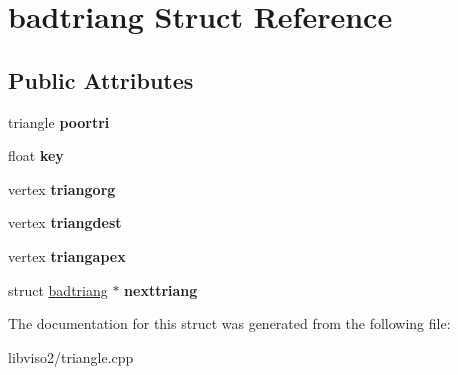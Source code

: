 \hypertarget{structbadtriang}{\section{badtriang Struct Reference}
\label{structbadtriang}
}
\subsection*{Public Attributes}
\begin{DoxyCompactItemize}
\item 
\hypertarget{structbadtriang_a11b132e0890478d17dff89632f334430}{triangle {\bfseries poortri}}\label{structbadtriang_a11b132e0890478d17dff89632f334430}

\item 
\hypertarget{structbadtriang_a9b7ace12adc62cf68e36e08bd8fbe9cb}{float {\bfseries key}}\label{structbadtriang_a9b7ace12adc62cf68e36e08bd8fbe9cb}

\item 
\hypertarget{structbadtriang_a92cb1bf38baf5779865262bacc7f8139}{vertex {\bfseries triangorg}}\label{structbadtriang_a92cb1bf38baf5779865262bacc7f8139}

\item 
\hypertarget{structbadtriang_ab1ad44ac98c5e8fd7940ad45f6ef25d1}{vertex {\bfseries triangdest}}\label{structbadtriang_ab1ad44ac98c5e8fd7940ad45f6ef25d1}

\item 
\hypertarget{structbadtriang_a44ad69b4811716b4adf50f50b98ab7f0}{vertex {\bfseries triangapex}}\label{structbadtriang_a44ad69b4811716b4adf50f50b98ab7f0}

\item 
\hypertarget{structbadtriang_abe7ce1ffe7da4fe5cb17ebcbaa18515b}{struct \hyperlink{structbadtriang}{badtriang} $\ast$ {\bfseries nexttriang}}\label{structbadtriang_abe7ce1ffe7da4fe5cb17ebcbaa18515b}

\end{DoxyCompactItemize}


The documentation for this struct was generated from the following file\+:\begin{DoxyCompactItemize}
\item 
libviso2/triangle.\+cpp\end{DoxyCompactItemize}
